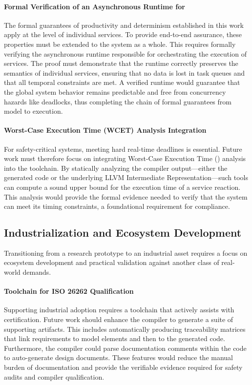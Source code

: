 \paragraph{Formal Verification of an Asynchronous Runtime for \Rust}
The formal guarantees of productivity and determinism established in this work apply at the level of
individual services. To provide end-to-end assurance, these properties must be extended to the
system as a whole. This requires formally verifying the asynchronous runtime responsible for
orchestrating the execution of \GRust services. The proof must demonstrate that the runtime
correctly preserves the semantics of individual services, ensuring that no data is lost in task
queues and that all temporal constraints are met. A verified runtime would guarantee that the global
system behavior remains predictable and free from concurrency hazards like deadlocks, thus
completing the chain of formal guarantees from model to execution.

\paragraph{Worst-Case Execution Time (WCET) Analysis Integration}
For safety-critical systems, meeting hard real-time deadlines is essential. Future work must
therefore focus on integrating Worst-Case Execution Time (\wcet) analysis into the \GRust toolchain.
By statically analyzing the compiler output---either the generated \Rust code or the underlying LLVM
Intermediate Representation---such tools can compute a sound upper bound for the execution time of a
service reaction. This analysis would provide the formal evidence needed to verify that the system
can meet its timing constraints, a foundational requirement for \iso compliance.

\subsection{Industrialization and Ecosystem Development}

Transitioning \GRust from a research prototype to an industrial asset requires a focus on ecosystem
development and practical validation against another class of real-world demands.

\paragraph{Toolchain for ISO 26262 Qualification}
Supporting industrial adoption requires a toolchain that actively assists with \iso certification.
Future work should enhance the compiler to generate a suite of supporting artifacts. This includes
automatically producing traceability matrices that link requirements to model elements and then to
the generated code. Furthermore, the compiler could parse documentation comments within the \GRust
code to auto-generate design documents. These features would reduce the manual burden of
documentation and provide the verifiable evidence required for safety audits and compiler
qualification.

